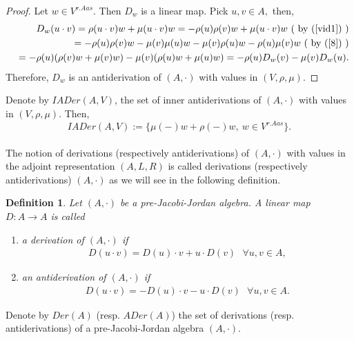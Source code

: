 \documentclass[12pt]{amsart}
\newtheorem{definition}[Theorem]{Definition}
\begin{document}
	\begin{proof}
		Let $w\in V^{r.Aas}.$ Then $D_w$ is a linear map.
		Pick $u,v\in A,$ then,
		\begin{eqnarray}
			&&	D_w(u\cdot v)=\rho(u\cdot v)w+\mu(u\cdot v)w=-\rho(u)\rho(v)w+\mu(u\cdot v)w \mbox{ ( by (\ref{vid1}) )}\nonumber\\
			&&=-\rho(u)\rho(v)w-\mu(v)\mu(u)w-
			\mu(v)\rho(u)w-\rho(u)\mu(v)w \mbox{ ( by (\ref{8}) )}\nonumber\\
			&&=
			-\rho(u)(\rho(v)w+\mu(v)w) -\mu(v)(\rho(u)w+\mu(u)w)=-\rho(u)D_w(v)-\mu(v)D_w(u).\nonumber
		\end{eqnarray}
		Therefore, $D_w$ is an antiderivation of  $(A,\cdot)$ with values in $(V,\rho,\mu)$. 
	\end{proof}	
	Denote by $IADer(A,V)$, the set of inner antiderivations of  $(A,\cdot)$ with values in $(V,\rho,\mu).$ Then, 
	$$IADer(A,V):=\{\mu(-)w+\rho(-)w,\ w\in V^{r.Aas}\}.$$ 
	\\	
	The notion of derivations (respectively antiderivations) of  $(A,\cdot)$ with values in the adjoint representation $(A,L,R)$ is called  derivations (respectively antiderivations)   $(A,\cdot)$ as we will see in the following definition.
	\begin{definition} \label{DfDer}
		Let $(A,\cdot)$ be a pre-Jacobi-Jordan algebra.  A linear map $D: A\rightarrow A$ is called 
		\begin{enumerate}
			\item a derivation of $(A,\cdot)$  if
			\begin{eqnarray}
				D(u\cdot v)=D(u)\cdot v+u\cdot D(v) \mbox{ $\forall u,v\in A,$}\label{der1}
			\end{eqnarray}
			\item an antiderivation of $(A,\cdot)$  if
			\begin{eqnarray}
				D(u\cdot v)=-D(u)\cdot v-u\cdot D(v) \mbox{ $\forall u,v\in A.$}\label{ader1}
			\end{eqnarray}
		\end{enumerate}	
	\end{definition}
	Denote by $Der(A)$ (resp. $ADer(A)$) the set of derivations (resp. antiderivations)  of a  pre-Jacobi-Jordan algebra $(A,\cdot).$\\  
	
\end{document}
